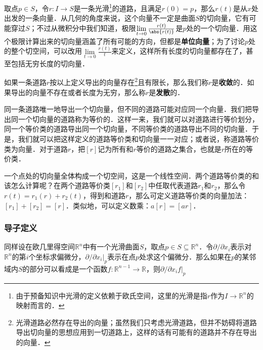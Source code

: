 取点$p\in S$，令$r:I\rightarrow S$是一条光滑\footnote{由于预备知识中光滑的定义依赖于欧氏空间，这里的光滑是指$r$作为$I\rightarrow\mathbb{R}^n$的映射而言的．}的道路，且满足$r(0)=p$，那么$r(t)$是从$x$处出发的一条向量．从几何的角度来说，这个向量不一定是曲面$S$的切向量，它有可能穿过$S$；不过从微积分中我们知道，极限$\lim\limits_{t\rightarrow 0}\frac{r(t)}{\abs{r(t)}}$是$p$处的一个切向量．用这个极限计算出来的切向量涵盖了所有可能的方向，但都是\textbf{单位向量}；为了讨论$p$处的整个切空间，可以改用$\lim\limits_{t\rightarrow 0}\frac{r(t)}{t}$来定义，这样所有长度的切向量都存在了，甚至包括无穷长度的切向量．

如果一条道路$r$按以上定义导出的向量存在\footnote{光滑道路必然存在导出的向量；虽然我们只考虑光滑道路，但并不妨碍将道路导出切向量的思想应用到一切道路上，这样的话有可能有的道路并不存在导出的向量．}且有限长，那么我们称$r$是\textbf{收敛}的．如果导出的向量不存在或者长度为无穷，那么称$r$是\textbf{发散}的．

同一条道路唯一地导出一个切向量，但不同的道路可能对应同一个向量．我们把导出同一个切向量的道路称为等价的．这样一来，我们就可以对道路进行等价划分，同一个等价类的道路导出同一个切向量，不同等价类的道路导出不同的切向量．于是，我们就可以把这样定义的道路等价类和切向量一一对应；或者说，称道路等价类为向量．对于道路$r$，把$[r]$记为所有和$r$等价的道路之集合，也就是$r$所在的等价类．

一个点处的切向量全体构成一个切空间，这是一个线性空间．两个道路等价类的和该怎么计算呢？在两个道路等价类$[r_1]$和$[r_2]$中任取代表道路$r_1$和$r_2$，那么令$r(t)=r_1(r)+r_2(t)$，得到和道路$r$，那么可定义道路等价类的向量加法：$[r_1]+[r_2]=[r]$．类似地，可以定义数乘：$a[r]=[ar]$．

\subsubsection{导子定义}

同样设在欧几里得空间$\mathbb{R}^n$中有一个光滑曲面$S$，取点$p\in S\subseteq\mathbb{R}^n$．令$\partial/\partial x_i$表示对$\mathbb{R}^n$的第$i$个坐标求偏微分，$\partial/\partial x_i|_{p}$表示在点$p$处求这个偏微分．那么如果在$p$的某邻域内$S$的部分可以看成是一个函数$f:\mathbb{R}^{n-1}\rightarrow\mathbb{R}$，则$\partial/\partial x_i f|_{p}$




